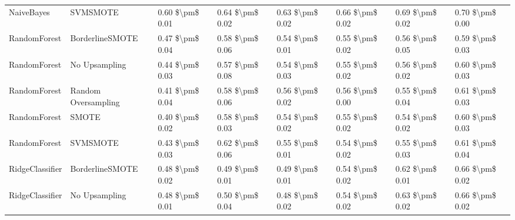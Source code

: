 \begin{tabular}{llllllll}
                     NaiveBayes &                      SVMSMOTE &     0.60 \$\textbackslash pm\$ 0.01 &           0.64 \$\textbackslash pm\$ 0.02 &       0.63 \$\textbackslash pm\$ 0.02 &        0.66 \$\textbackslash pm\$ 0.02 &                         0.69 \$\textbackslash pm\$ 0.02 & 0.70 \$\textbackslash pm\$ 0.00 \\
                   RandomForest &               BorderlineSMOTE &     0.47 \$\textbackslash pm\$ 0.04 &           0.58 \$\textbackslash pm\$ 0.06 &       0.54 \$\textbackslash pm\$ 0.01 &        0.55 \$\textbackslash pm\$ 0.02 &                         0.56 \$\textbackslash pm\$ 0.05 & 0.59 \$\textbackslash pm\$ 0.03 \\
                   RandomForest &                 No Upsampling &     0.44 \$\textbackslash pm\$ 0.03 &           0.57 \$\textbackslash pm\$ 0.08 &       0.54 \$\textbackslash pm\$ 0.03 &        0.55 \$\textbackslash pm\$ 0.02 &                         0.56 \$\textbackslash pm\$ 0.02 & 0.60 \$\textbackslash pm\$ 0.03 \\
                   RandomForest &           Random Oversampling &     0.41 \$\textbackslash pm\$ 0.04 &           0.58 \$\textbackslash pm\$ 0.06 &       0.56 \$\textbackslash pm\$ 0.02 &        0.56 \$\textbackslash pm\$ 0.00 &                         0.55 \$\textbackslash pm\$ 0.04 & 0.61 \$\textbackslash pm\$ 0.03 \\
                   RandomForest &                         SMOTE &     0.40 \$\textbackslash pm\$ 0.02 &           0.58 \$\textbackslash pm\$ 0.03 &       0.54 \$\textbackslash pm\$ 0.02 &        0.55 \$\textbackslash pm\$ 0.02 &                         0.54 \$\textbackslash pm\$ 0.02 & 0.60 \$\textbackslash pm\$ 0.03 \\
                   RandomForest &                      SVMSMOTE &     0.43 \$\textbackslash pm\$ 0.03 &           0.62 \$\textbackslash pm\$ 0.06 &       0.55 \$\textbackslash pm\$ 0.01 &        0.54 \$\textbackslash pm\$ 0.02 &                         0.55 \$\textbackslash pm\$ 0.03 & 0.61 \$\textbackslash pm\$ 0.04 \\
                RidgeClassifier &               BorderlineSMOTE &     0.48 \$\textbackslash pm\$ 0.02 &           0.49 \$\textbackslash pm\$ 0.01 &       0.49 \$\textbackslash pm\$ 0.01 &        0.54 \$\textbackslash pm\$ 0.02 &                         0.62 \$\textbackslash pm\$ 0.01 & 0.66 \$\textbackslash pm\$ 0.02 \\
                RidgeClassifier &                 No Upsampling &     0.48 \$\textbackslash pm\$ 0.01 &           0.50 \$\textbackslash pm\$ 0.04 &       0.48 \$\textbackslash pm\$ 0.02 &        0.54 \$\textbackslash pm\$ 0.02 &                         0.63 \$\textbackslash pm\$ 0.02 & 0.66 \$\textbackslash pm\$ 0.02 \\

\end{tabular}
